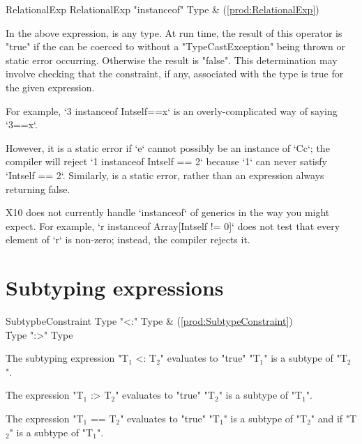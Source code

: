 \begin{bbgrammar}
 RelationalExp    \:  RelationalExp \xcd"instanceof" Type
 & (\ref{prod:RelationalExp})\\%
\end{bbgrammar}

In the above expression,  is any type. At run time, the
result of this operator is \xcd"true" if the
 can be coerced to 
without a \xcd"TypeCastException" being thrown or static error occurring.
Otherwise the result is \xcd"false". This determination may involve checking
that the constraint, if any, associated with the type is true for the given
expression.

For example, \xcd`3 instanceof Int{self==x}` is an overly-complicated way of
saying \xcd`3==x`.


However, it is a static error if \xcd`e` cannot possibly be an instance of
\xcd`C{c}`; the compiler will reject \xcd`1 instanceof Int{self == 2}` because
\xcd`1` can never satisfy \xcd`Int{self == 2}`. Similarly,  is a static error, rather than an expression always returning false. 

\limitationx
X10 does not currently handle \xcd`instanceof` of generics in the way you
might expect.  For example, \xcd`r instanceof Array[Int{self != 0}]` does
not test that every element of \xcd`r` is non-zero; instead, the compiler
rejects it.


\section{Subtyping expressions}

\begin{bbgrammar}
 SubtypbeConstraint    \: Type  \xcd"<:" Type  & (\ref{prod:SubtypeConstraint})\\%
    \| Type  \xcd":>" Type \\
\end{bbgrammar}

The subtyping expression \xcdmath"T$_1$ <: T$_2$" evaluates to \xcd"true"
\xcdmath"T$_1$" is a subtype of \xcdmath"T$_2$".

The expression \xcdmath"T$_1$ :> T$_2$" evaluates to \xcd"true"
\xcdmath"T$_2$" is a subtype of \xcdmath"T$_1$".

The expression \xcdmath"T$_1$ == T$_2$"
evaluates to  \xcd"true" \xcdmath"T$_1$" is a subtype of \xcdmath"T$_2$" and
if \xcdmath"T$_2$" is a subtype of \xcdmath"T$_1$".

